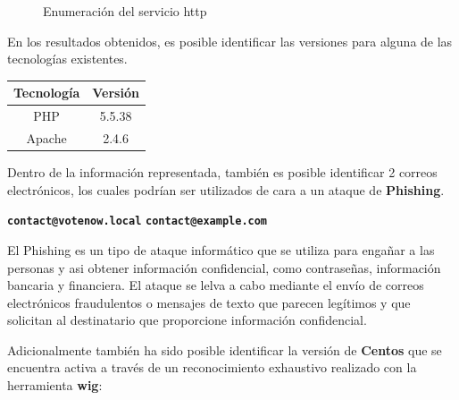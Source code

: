 \documentclass[a4paper]{article}
\begin{document}
\begin{figure}[h]
  \centering
  \setlength{\fboxrule}{0.8pt}
  \caption{Enumeración del servicio http}
\end{figure}

\vspace{0.4cm}
En los resultados obtenidos, es posible identificar las versiones para alguna de las
tecnologías existentes.
\vspace{0.4cm}

\begin{center}
  \begin{tabular}{c | c}
    \textbf{Tecnología}  & \textbf{Versión} \\
    \hline
    PHP & 5.5.38\\
    Apache & 2.4.6\\
  \end{tabular}
\end{center}
\vspace{0.4cm}
\justifying

Dentro de la información representada, también es posible identificar 2 correos electrónicos,
los cuales podrían ser utilizados de cara a un ataque de \textbf{Phishing}.\par


\vspace{0.4cm}
\begin{center}
  \textbf{\texttt{contact@votenow.local}} \quad \textbf{\texttt{contact@example.com}}
\end{center}
\vspace{0.4cm}

El Phishing es un tipo de ataque informático que se utiliza para engañar a las personas
y asi obtener información confidencial, como contraseñas, información bancaria y financiera.
El ataque se lelva a cabo mediante el envío de correos electrónicos fraudulentos o mensajes
de texto que parecen legítimos y que solicitan al destinatario que proporcione información
confidencial.

Adicionalmente también ha sido posible identificar la versión de \textbf{Centos} que
se encuentra activa a través de un reconocimiento exhaustivo realizado con la herramienta
\textbf{wig}:
\end{document}
